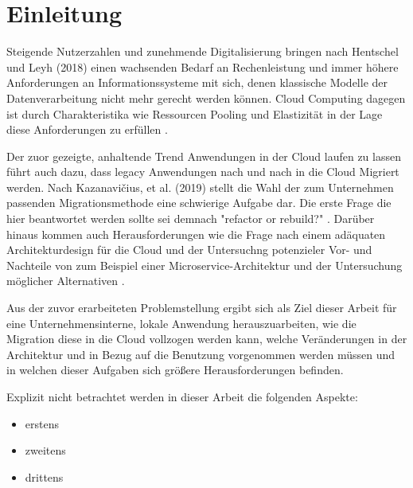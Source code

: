 
\chapter{Einleitung}


Steigende Nutzerzahlen und zunehmende Digitalisierung bringen nach Hentschel und Leyh (2018) einen wachsenden Bedarf an Rechenleistung und immer höhere Anforderungen an Informationssysteme mit sich, denen klassische Modelle der Datenverarbeitung nicht mehr gerecht werden können. Cloud Computing dagegen ist durch Charakteristika wie Ressourcen Pooling und Elastizität \cite[Vgl.][S. 2]{Mell2011} in der Lage diese Anforderungen zu erfüllen \cite[Vgl.][S. 6]{Reinheimer2018}.

Der zuor gezeigte, anhaltende Trend Anwendungen in der Cloud laufen zu lassen führt auch dazu, dass legacy Anwendungen nach und nach in die Cloud Migriert werden. Nach Kazanavičius, et al. (2019) stellt die Wahl der zum Unternehmen passenden Migrationsmethode eine schwierige Aufgabe dar. Die erste Frage die hier beantwortet werden sollte sei demnach "refactor or rebuild?" \cite[Vgl.][S. 4]{Kazanavicius2019}. Darüber hinaus kommen auch Herausforderungen wie die Frage nach einem adäquaten Architekturdesign für die Cloud \cite[Vgl.][S. 14]{Pahl} und der Untersuchng potenzieler Vor- und Nachteile
von zum Beispiel einer Microservice-Architektur und der Untersuchung möglicher Alternativen \cite[Vgl.][S. 3]{Carrasco2018}.

Aus der zuvor erarbeiteten Problemstellung ergibt sich als Ziel dieser Arbeit für eine Unternehmensinterne, lokale Anwendung herauszuarbeiten, wie die Migration diese in die Cloud vollzogen werden kann, welche Veränderungen in der Architektur und in Bezug auf die Benutzung vorgenommen werden müssen und in welchen dieser Aufgaben sich größere Herausforderungen befinden.

Explizit nicht betrachtet werden in dieser Arbeit die folgenden Aspekte:
\begin{itemize}
\item erstens
\item zweitens
\item drittens
\end{itemize}

\pagebreak



